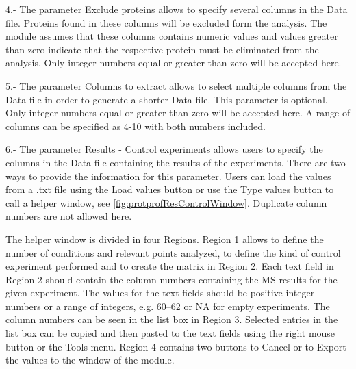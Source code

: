 \num{4}.- The parameter Exclude proteins allows to specify several columns in the Data file. Proteins found in these columns will be excluded form the analysis. The module assumes that these columns contains numeric values and values greater than zero indicate that the respective protein must be eliminated from the analysis. Only integer numbers equal or greater than zero will be accepted here.  

\num{5}.- The parameter Columns to extract allows to select multiple columns from the Data file in order to generate a shorter Data file. This parameter is optional. Only integer numbers equal or greater than zero will be accepted here. A range of columns can be specified as 4-10 with both numbers included.

\num{6}.-  \label{par:protprofResultControl}The parameter Results - Control experiments allows users to specify the columns in the Data file containing the results of the experiments. There are two ways to provide the information for this parameter. Users can load the values from a .txt file using the Load values button or use the Type values button to call a helper window, see \autoref{fig:protprofResControlWindow}. Duplicate column numbers are not allowed here.

The helper window is divided in four Regions. Region \num{1} allows to define the number of conditions and relevant points analyzed, to define the kind of control experiment performed and to create the matrix in Region \num{2}. Each text field in Region \num{2} should contain the column numbers containing the MS results for the given experiment. The values for the text fields should be positive integer numbers or a range of integers, e.g. \numrange[range-phrase=--]{60}{62} or NA for empty experiments. The column numbers can be seen in the list box in Region \num{3}. Selected entries in the list box can be copied and then pasted to the text fields using the right mouse button or the Tools menu. Region \num{4} contains two buttons to Cancel or to Export the values to the window of the module.  

